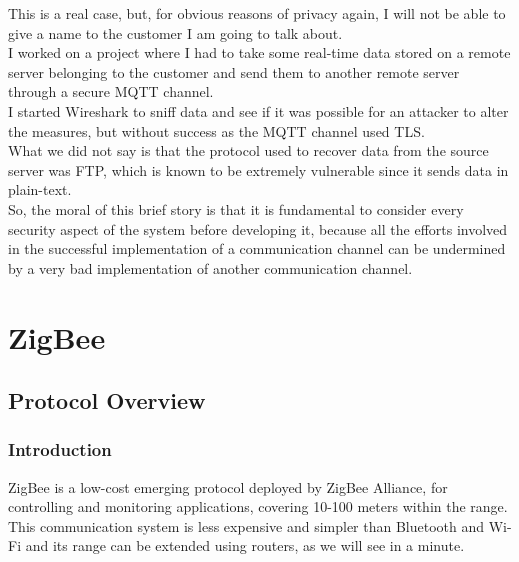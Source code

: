 \documentclass[12pt]{report}
\begin{document}
{{This is a real case, but, for obvious reasons of privacy again, I will not be able to give a name to the customer I am going to talk about.\\

I worked on a project where I had to take some real-time data stored on a remote server belonging to the customer and send them to another remote server through a secure MQTT channel.\\
I started Wireshark to sniff data and see if it was possible for an attacker to alter the measures, but without success as the MQTT channel used TLS.\\

What we did not say is that the protocol used to recover data from the source server was FTP, which is known to be extremely vulnerable since it sends data in plain-text.\\


So, the moral of this brief story is that it is fundamental to consider every security aspect of the system before developing it, because all the efforts involved in the successful implementation of a communication channel can be undermined by a very bad implementation of another communication channel.\\


\part{ZigBee}

\chapter{Protocol Overview}

\section{Introduction}
\bigskip

ZigBee is a low-cost emerging protocol deployed by ZigBee Alliance, for controlling and monitoring applications, covering 10-100 meters within the range. \\
This communication system is less expensive and simpler than Bluetooth and Wi-Fi and its range can be extended using routers, as we will see in a minute.\\

}}
\end{document}
